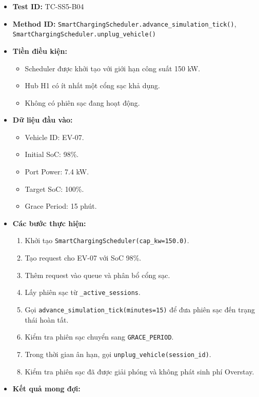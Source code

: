 \documentclass[11pt,a4paper]{article}
\providecommand{\tightlist}{%
  \setlength{\itemsep}{0pt}\setlength{\parskip}{0pt}}
\begin{document}
\begin{itemize}
\tightlist
\item
  \textbf{Test ID:} TC-SS5-B04
\item
  \textbf{Method ID:}
  \texttt{SmartChargingScheduler.advance\_simulation\_tick()},
  \texttt{SmartChargingScheduler.unplug\_vehicle()}
\item
  \textbf{Tiền điều kiện:}

  \begin{itemize}
  \tightlist
  \item
    Scheduler được khởi tạo với giới hạn công suất 150 kW.
  \item
    Hub H1 có ít nhất một cổng sạc khả dụng.
  \item
    Không có phiên sạc đang hoạt động.
  \end{itemize}
\item
  \textbf{Dữ liệu đầu vào:}

  \begin{itemize}
  \tightlist
  \item
    Vehicle ID: EV-07.
  \item
    Initial SoC: 98\%.
  \item
    Port Power: 7.4 kW.
  \item
    Target SoC: 100\%.
  \item
    Grace Period: 15 phút.
  \end{itemize}
\item
  \textbf{Các bước thực hiện:}

  \begin{enumerate}
  \def\labelenumi{\arabic{enumi}.}
  \tightlist
  \item
    Khởi tạo \texttt{SmartChargingScheduler(cap\_kw=150.0)}.
  \item
    Tạo request cho EV-07 với SoC 98\%.
  \item
    Thêm request vào queue và phân bổ cổng sạc.
  \item
    Lấy phiên sạc từ \texttt{\_active\_sessions}.
  \item
    Gọi \texttt{advance\_simulation\_tick(minutes=15)} để đưa phiên sạc
    đến trạng thái hoàn tất.
  \item
    Kiểm tra phiên sạc chuyển sang \texttt{GRACE\_PERIOD}.
  \item
    Trong thời gian ân hạn, gọi \texttt{unplug\_vehicle(session\_id)}.
  \item
    Kiểm tra phiên sạc đã được giải phóng và không phát sinh phí
    Overstay.
  \end{enumerate}
\item
  \textbf{Kết quả mong đợi:}


\end{itemize}
\end{document}
